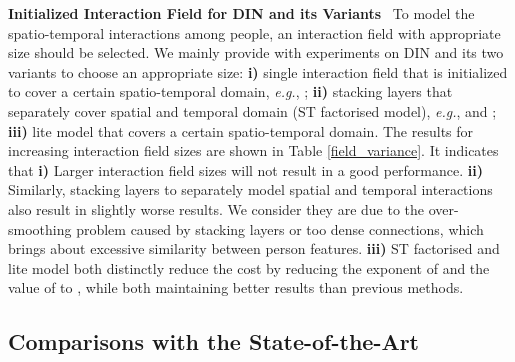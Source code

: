 \documentclass[10pt,twocolumn,letterpaper]{article}
\begin{document}
\textbf{Initialized Interaction Field for DIN and its Variants} \ To model the spatio-temporal interactions among people, an interaction field with appropriate size should be selected. We mainly provide with experiments on DIN and its two variants to choose an appropriate size: \textbf{i)} single interaction field that is initialized to cover a certain spatio-temporal domain, \textit{e.g.}, ; \textbf{ii)} stacking layers that separately cover spatial and temporal domain (ST factorised model), \textit{e.g.},  and ; \textbf{iii)} lite model that covers a certain spatio-temporal domain. The results for increasing interaction field sizes are shown in Table \ref{field_variance}. It indicates that \textbf{i)} Larger interaction field sizes will not result in a good performance. \textbf{ii)} Similarly, stacking layers to separately model spatial and temporal interactions also result in slightly worse results. We consider they are due to the over-smoothing problem \cite{deeper_insignt_intoGCN} caused by stacking layers or too dense connections, which brings about excessive similarity between person features. \textbf{iii)} ST factorised and lite model both distinctly reduce the cost by reducing the exponent of  and the value of  to , while both maintaining better results than previous methods.













\subsection{Comparisons with the State-of-the-Art}
\end{document}
